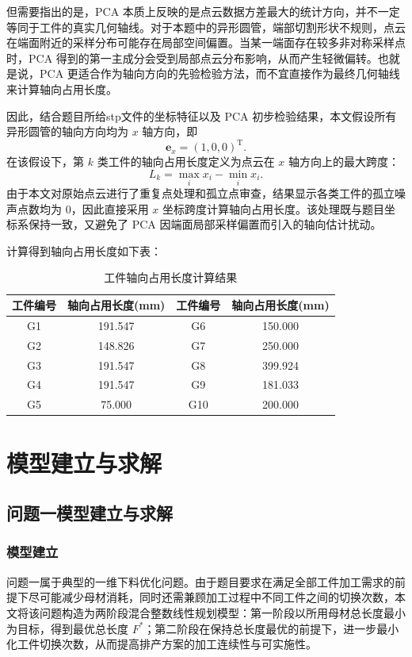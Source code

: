 \documentclass[UTF8]{ctexart}
\begin{document}
但需要指出的是，PCA 本质上反映的是点云数据方差最大的统计方向，并不一定等同于工件的真实几何轴线。对于本题中的异形圆管，端部切割形状不规则，点云在端面附近的采样分布可能存在局部空间偏置。当某一端面存在较多非对称采样点时，PCA 得到的第一主成分会受到局部点云分布影响，从而产生轻微偏转。也就是说，PCA 更适合作为轴向方向的先验检验方法，而不宜直接作为最终几何轴线来计算轴向占用长度。

因此，结合题目所给stp文件的坐标特征以及 PCA 初步检验结果，本文假设所有异形圆管的轴向方向均为 $x$ 轴方向，即
\[
\boldsymbol e_x=(1,0,0)^{\mathrm T}.
\]
在该假设下，第 $k$ 类工件的轴向占用长度定义为点云在 $x$ 轴方向上的最大跨度：
\[
L_k=\max_{i} x_i-\min_{i} x_i.
\]
由于本文对原始点云进行了重复点处理和孤立点审查，结果显示各类工件的孤立噪声点数均为 0，因此直接采用 $x$ 坐标跨度计算轴向占用长度。该处理既与题目坐标系保持一致，又避免了 PCA 因端面局部采样偏置而引入的轴向估计扰动。

计算得到轴向占用长度如下表：

\begin{table}[htbp]
\centering
\caption{工件轴向占用长度计算结果}
\label{tab:axial_lengths}
\begin{tabular}{cccc}
\toprule
工件编号 & 轴向占用长度(mm)&工件编号 & 轴向占用长度(mm) \\
\midrule
G1  & 191.547 & G6  & 150.000 \\
G2  & 148.826 & G7  & 250.000 \\
G3  & 191.547 & G8  & 399.924 \\
G4  & 191.547 & G9  & 181.033 \\
G5  & 75.000 & G10 & 200.000 \\
\bottomrule
\end{tabular}
\end{table}


\section{模型建立与求解}

\subsection{问题一模型建立与求解}
\subsubsection{模型建立}
问题一属于典型的一维下料优化问题。由于题目要求在满足全部工件加工需求的前提下尽可能减少母材消耗，同时还需兼顾加工过程中不同工件之间的切换次数，本文将该问题构造为两阶段混合整数线性规划模型：第一阶段以所用母材总长度最小为目标，得到最优总长度 $F^*$；第二阶段在保持总长度最优的前提下，进一步最小化工件切换次数，从而提高排产方案的加工连续性与可实施性。
\end{document}

